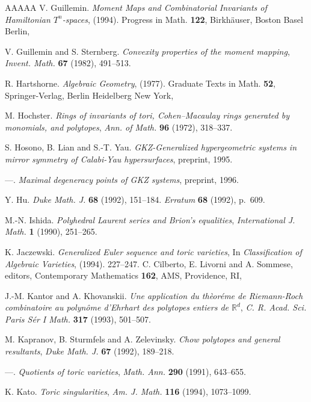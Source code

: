 \documentclass{amsart}
\theoremstyle{plain}
\theoremstyle{definition}
\begin{document}
\begin{thebibliography}{AAAAA}
V. Guillemin. \textit{Moment Maps and Combinatorial Invariants of Hamiltonian $T^n$-spaces}, (1994). Progress in Math. \textbf{122}, Birkh\"auser, Boston Basel Berlin,

V. Guillemin and S. Sternberg. \textit{Convexity properties of the moment mapping}, \textit{Invent. Math.} \textbf{67} (1982), 491--513.

R. Hartshorne. \textit{Algebraic Geometry}, (1977). Graduate Texts in Math. \textbf{52}, Springer-Verlag, Berlin Heidelberg New York,

M. Hochster. \textit{Rings of invariants of tori, Cohen--Macaulay rings generated by monomials, and polytopes}, \textit{Ann. of Math.} \textbf{96} (1972), 318--337.

S. Hosono, B. Lian and S.-T. Yau. \textit{GKZ-Generalized hypergeometric systems in mirror symmetry of Calabi-Yau hypersurfaces}, preprint, 1995.

---. \textit{Maximal degeneracy points of GKZ systems}, preprint, 1996.

Y. Hu. \textit{Duke Math. J.} \textbf{68} (1992), 151--184. \textit{Erratum} \textbf{68} (1992), p.~609.

M.-N. Ishida. \textit{Polyhedral Laurent series and Brion's equalities}, \textit{International J. Math.} \textbf{1} (1990), 251--265.

K. Jaczewski. \textit{Generalized Euler sequence and toric varieties}, In \textit{Classification of Algebraic Varieties}, (1994). 227--247. C. Cilberto, E. Livorni and A. Sommese, editors, Contemporary Mathematics \textbf{162}, AMS, Providence, RI,

J.-M. Kantor and A. Khovanskii. \textit{Une application du th\`eor\'eme de Riemann-Roch combinatoire au polyn\^ome d'Ehrhart des polytopes entiers de ${\mathbb R}^d$}, \textit{C. R. Acad. Sci. Paris S\'er I Math.} \textbf{317} (1993), 501--507.

M. Kapranov, B. Sturmfels and A. Zelevinsky. \textit{Chow polytopes and general resultants}, \textit{Duke Math. J.} \textbf{67} (1992), 189--218.

---. \textit{Quotients of toric varieties}, \textit{Math. Ann.} \textbf{290} (1991), 643--655.

K. Kato. \textit{Toric singularities}, \textit{Am. J. Math.} \textbf{116} (1994), 1073--1099.


\end{thebibliography}
\end{document}
